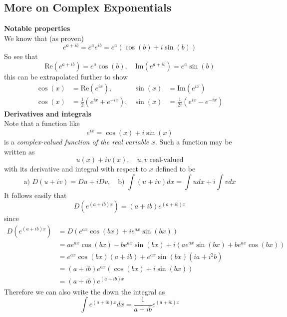 \documentclass{report}
\begin{document}
\subsection{More on Complex Exponentials}%
\textbf{Notable properties}\\
We know that (as proven)
\begin{equation*}
e^{a+ib}=e^ae^{ib}=e^a(\cos(b)+i\sin(b))
\end{equation*}
So see that
\begin{equation*}
\text{Re}(e^{a+ib})=e^a\cos(b),\quad
\text{Im}(e^{a+ib})=e^a\sin(b)
\end{equation*}
this can be extrapolated further to show
\begin{align*}
\cos(x)&=\text{Re}(e^{ix}),&\sin(x)&=\text{Im}(e^{ix})\\
\cos(x)&=\frac{1}{2}(e^{ix}+e^{-ix}),&\sin(x)&=
\frac{1}{2i}(e^{ix}-e^{-ix})
\end{align*}
\textbf{Derivatives and integrals}\\
Note that a function like
\begin{equation*}
e^{ix}=\cos(x)+i\sin(x)
\end{equation*}
is a \textit{complex-valued function of the real variable} $x$. Such a function may be written as
\begin{equation*}
u(x)+iv(x),\quad u,v\text{ real-valued}
\end{equation*}
with its derivative and integral with respect to $x$ defined to be
\begin{equation*}
\text{a) }D(u+iv)=Du+iDv,\quad\text{b) }\int(u+iv)dx=\int udx+i\int vdx
\end{equation*}
It follows easily that
\begin{equation*}
D(e^{(a+ib)x})=(a+ib)e^{(a+ib)x}
\end{equation*}
since
\begin{align*}
D(e^{(a+ib)x})&=D(e^{ax}\cos(bx)+ie^{ax}\sin(bx))\\
&=ae^{ax}\cos(bx)-be^{ax}\sin(bx)+i(ae^{ax}\sin(bx)+be^{ax}\cos(bx))\\
&=e^{ax}\cos(bx)(a+ib)+e^{ax}\sin(bx)(ia+i^2b)\\
&=(a+ib)e^{ax}(\cos(bx)+i\sin(bx))\\
&=(a+ib)e^{(a+ib)x}
\end{align*}
Therefore we can also write the down the integral as
\begin{equation*}
\int e^{(a+ib)x}dx=\frac{1}{a+ib}e^{(a+ib)x}
\end{equation*}
\newpage
\end{document}
